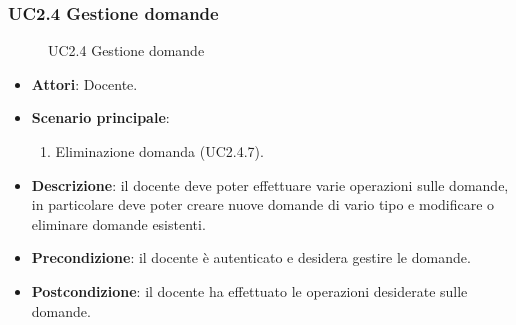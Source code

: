 \subsubsection{UC2.4 Gestione domande}
\begin{figure}[H]
\centering
\noindent{}
\caption{UC2.4 Gestione domande}
\end{figure}
\begin{itemize}
\item \textbf{Attori}: Docente.
\item \textbf{Scenario principale}:
\begin{enumerate}
\item Eliminazione domanda (UC2.4.7).
\end{enumerate}
\item \textbf{Descrizione}: il docente deve poter effettuare varie operazioni sulle domande, in particolare deve poter creare nuove domande di vario tipo e modificare o eliminare domande esistenti.
\item \textbf{Precondizione}: il docente è autenticato e desidera gestire le domande.
\item \textbf{Postcondizione}: il docente ha effettuato le operazioni desiderate sulle domande.
\end{itemize}
